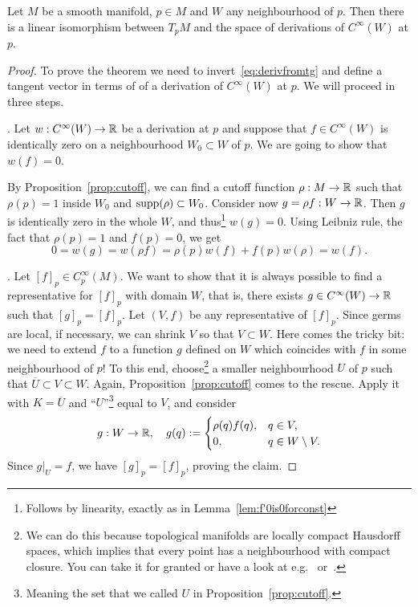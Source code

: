 \begin{proposition}
  Let $M$ be a smooth manifold, $p\in M$ and $W$ any neighbourhood of $p$.
  Then there is a linear isomorphism between $T_p M$ and the space of derivations of $C^\infty(W)$ at $p$.
\end{proposition}
\begin{proof}
  To prove the theorem we need to invert~\eqref{eq:derivfromtg} and define a tangent vector in terms of of a derivation of $C^\infty(W)$ at $p$.
  We will proceed in three steps.

  . Let $w:C^\infty(W) \to\mathbb{R}$ be a derivation at $p$ and suppose that $f\in C^\infty(W)$ is identically zero on a neighbourhood $W_0\subset W$ of $p$. We are going to show that $w(f)=0$.

  By Proposition~\ref{prop:cutoff}, we can find a cutoff function $\rho:M\to\mathbb{R}$ such that $\rho(p)=1$ inside $W_0$ and $\operatorname{supp}(\rho) \subset W_0$. Consider now $g = \rho f : W \to \mathbb{R}$. Then $g$ is identically zero in the whole $W$, and thus\footnote{Follows by linearity, exactly as in Lemma~\ref{lem:f'0is0forconst}} $w(g) = 0$. Using Leibniz rule, the fact that $\rho(p)=1$ and $f(p) = 0$, we get
  \begin{equation}
    0 = w(g) = w(\rho f) = \rho(p) w(f) + f(p)w(\rho) = w(f).
  \end{equation}

  .
  Let $[f]_p\in C_p^\infty(M)$.
  We want to show that it is always possible to find a representative for $[f]_p$ with domain $W$, that is, there exists $g\in C^\infty(W)\to\mathbb{R}$ such that $[g]_p = [f]_p$.
  Let $(V, f)$ be any representative of $[f]_p$.
  Since germs are local, if necessary, we can shrink $V$ so that $V\subset W$.
  Here comes the tricky bit: we need to extend $f$ to a function $g$ defined on $W$ which coincides with $f$ in some neighbourhood of $p$!
  To this end, choose\footnote{We can do this because topological manifolds are locally compact Hausdorff spaces, which implies that every point has a neighbourhood with compact closure. You can take it for granted or have a look at e.g.~\cite[Lemma 4.65]{book:lee:topology} or~\cite{book:munkres:topology}.} a smaller neighbourhood $U$ of $p$ such that $\overline{U}\subset V\subset W$.
  Again, Proposition~\ref{prop:cutoff} comes to the rescue. Apply it with $K=\overline{U}$ and ``$U$''\footnote{Meaning the set that we called $U$ in Proposition~\ref{prop:cutoff}.} equal to $V$, and consider
  \begin{equation}
    g:W\to\mathbb{R}, \quad
    g(q) := \begin{cases}
      \rho(q)f(q), & q\in V,\\
      0, & q \in W\setminus V.
    \end{cases}
  \end{equation}
  Since $g|_U = f$, we have $[g]_p = [f]_p$, proving the claim.


\end{proof}
